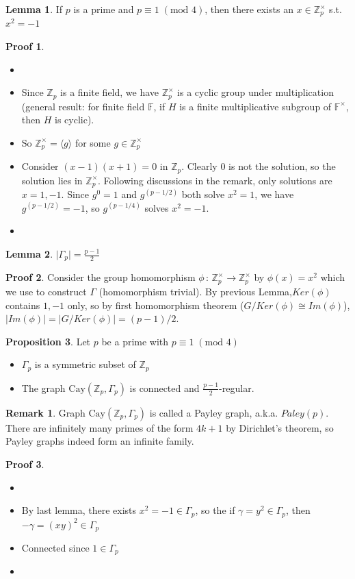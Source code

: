 \documentclass{book}
\newcommand{\Z}{\mathbb{Z}}
\newcommand{\F}{\mathbb{F}}
\newcommand{\inner}[1]{\langle #1 \rangle}
\newcommand{\abs}[1]{\lvert #1 \rvert }
\newcommand{\Cay}[1]{\textrm{Cay}( #1 )}
\newcommand{\Mod}[1]{\;(\textrm{mod } #1 )}
\theoremstyle{definition}
\newtheorem{lemma}{Lemma}[chapter]
\newtheorem{proposition}[lemma]{Proposition}
\theoremstyle{remarkstyle}
\newtheorem*{remark}{Remark}%
\newtheorem*{myproof}{Proof}%
\begin{document}
\begin{lemma}
    If $p$ is a prime and $p\equiv 1\Mod{4}$, then there exists an $x\in \Z^\times_p$ s.t. $x^2=-1$
\end{lemma}
\begin{myproof}
\begin{itemize}
    \item[] 
    \item Since $\Z_p$ is a finite field, we have $\Z^\times_p$ is a cyclic group under multiplication (general result: for finite field $\F$, if $H$ is a finite multiplicative subgroup of $\F^\times$, then $H$ is cyclic). 
    \item So $\Z^\times_p = \inner{g}$ for some $g\in \Z^\times_p$
    \item Consider $(x-1)(x+1)=0$ in $\Z_p$. Clearly $0$ is not the solution, so the solution lies in $\Z^\times_p$. Following discussions in the remark, only solutions are $x=1,-1$. Since $g^0=1$ and $g^{(p-1/2)} $ both solve $x^2=1$, we have $g^{(p-1/2)}=-1$, so $g^{(p-1/4)}$ solves $x^2=-1$.
    \item[] 
\end{itemize}
\end{myproof}

\begin{lemma}
    $\abs{\Gamma_p} = \frac{p-1}{2}$
\end{lemma}
\begin{myproof}
    Consider the group homomorphism $\phi\,:\,\Z^\times_p\rightarrow\Z^\times_p$ by $\phi(x)=x^2$ which we use to construct $\Gamma$ (homomorphism trivial). By previous Lemma,$Ker(\phi)$ contains $1,-1$ only, so by first homomorphism theorem ($G/Ker(\phi) \cong Im(\phi)$), $\abs{Im(\phi)}=\abs{G/Ker(\phi)}=(p-1)/2$. \newline
\end{myproof}

\begin{proposition}
    Let $p$ be a prime with $p\equiv 1\Mod{4}$
    \begin{itemize}
        \item $\Gamma_p$ is a symmetric subset of $\Z_p$
        \item The graph $\Cay{\Z_p,\Gamma_p}$ is connected and $\frac{p-1}{2}$-regular.
    \end{itemize}
\end{proposition}
\begin{remark}
    Graph $\Cay{\Z_p,\Gamma_p}$ is called a Payley graph, a.k.a. $Paley(p)$. There are infinitely many primes of the form $4k+1$ by Dirichlet's theorem, so Payley graphs indeed form an infinite family.
\end{remark}
\begin{myproof}
    \begin{itemize}
        \item[]
        \item By last lemma, there exists $x^2=-1\in\Gamma_p$, so the if $\gamma=y^2\in\Gamma_p$, then $-\gamma=(xy)^2\in\Gamma_p$
        \item Connected since $1\in\Gamma_p$
        \item[] 
    \end{itemize}
\end{myproof}
\end{document}
